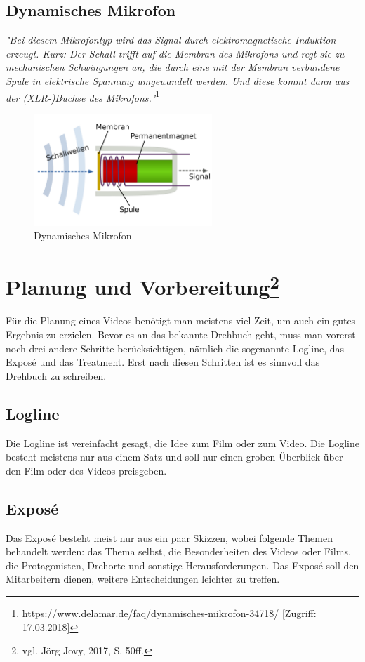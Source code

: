 \subsection{Dynamisches Mikrofon}
\textit{"Bei diesem Mikrofontyp wird das Signal durch elektromagnetische Induktion erzeugt. Kurz: Der Schall trifft auf die Membran des Mikrofons und regt sie zu mechanischen Schwingungen an, die durch eine mit der Membran verbundene Spule in elektrische Spannung umgewandelt werden. Und diese kommt dann aus der (XLR-)Buchse des Mikrofons."}\footnote{\label{}https://www.delamar.de/faq/dynamisches-mikrofon-34718/ [Zugriff: 17.03.2018]}
\begin{figure}[H]
	\centering
	\includegraphics[width=0.6\textwidth]{abb9} 
	\caption{Dynamisches Mikrofon}
\end{figure}
\section[Planung und Vorbereitung]{Planung und Vorbereitung\protect\footnote{\label{}vgl. Jörg Jovy, 2017, S. 50ff.}}
Für die Planung eines Videos benötigt man meistens viel Zeit, um auch ein gutes Ergebnis zu erzielen. Bevor es an das bekannte Drehbuch geht, muss man vorerst noch drei andere Schritte berücksichtigen, nämlich die sogenannte Logline, das Expos\'{e} und das Treatment. Erst nach diesen Schritten ist es sinnvoll das Drehbuch zu schreiben. 
\subsection{Logline}
Die Logline ist vereinfacht gesagt, die Idee zum Film oder zum Video. Die Logline besteht meistens nur aus einem Satz und soll nur einen groben Überblick über den Film oder des Videos preisgeben. 
\subsection{Expos\'{e}}
Das Expos\'{e} besteht meist nur aus ein paar Skizzen, wobei folgende Themen behandelt werden: das Thema selbst, die Besonderheiten des Videos oder Films, die Protagonisten, Drehorte und sonstige Herausforderungen. Das Expos\'{e} soll den Mitarbeitern dienen, weitere Entscheidungen leichter zu treffen.
